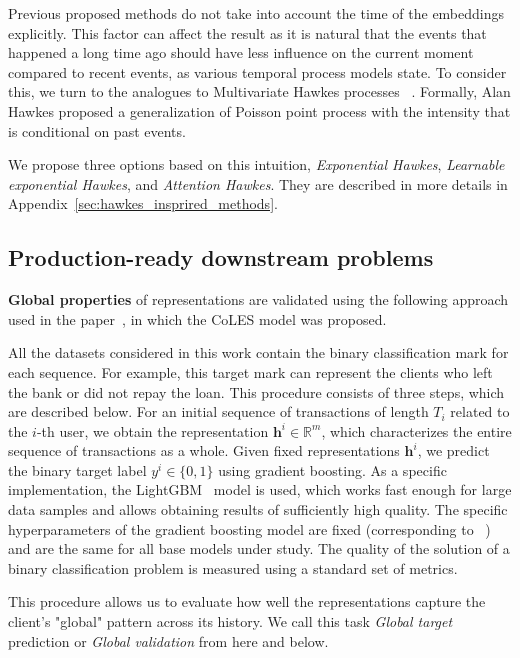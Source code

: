 Previous proposed methods do not take into account the time of the embeddings explicitly. This factor can affect the result as it is natural that the events that happened a long time ago should have less influence on the current moment compared to recent events, as various temporal process models state. To consider this, we turn to the analogues to Multivariate Hawkes processes ~\cite{hawkes1971spectra,hawkes2018hawkes}. 
Formally, Alan Hawkes proposed a generalization of Poisson point process with the intensity that is conditional on past events.

We propose three options based on this intuition, \emph{Exponential Hawkes}, \emph{Learnable exponential Hawkes}, and \emph{Attention Hawkes}. 
They are described in more details in Appendix~\ref{sec:hawkes_insprired_methods}.


\subsection{Production-ready downstream problems} 
\label{sec:validation_methods}

\textbf{Global properties} of representations are validated using the following approach used in the paper~\cite{babaev2022coles}, in which the CoLES model was proposed.

All the datasets considered in this work contain the binary classification mark for each sequence. 
For example, this target mark can represent the clients who left the bank or did not repay the loan. This procedure consists of three steps, which are described below. 
For an initial sequence of transactions of length $T_{i}$ related to the $i$-th user, we obtain the representation $\mathbf{h}^{i}\in\mathbb{R}^{m}$, which characterizes the entire sequence of transactions as a whole. 
Given fixed representations $\mathbf{h}^{i}$, we predict the binary target label $y^{i}\in\{0, 1\}$ using gradient boosting. 
As a specific implementation, the LightGBM~\cite{ke2017lightgbm} model is used, which works fast enough for large data samples and allows obtaining results of sufficiently high quality. 
The specific hyperparameters of the gradient boosting model are fixed (corresponding to ~\cite{babaev2022coles}) and are the same for all base models under study. The quality of the solution of a binary classification problem is measured using a standard set of metrics.

This procedure allows us to evaluate how well the representations capture the client's "global" pattern across its history. 
We call this task \textit{Global target} prediction or \textit{Global validation} from here and below.

